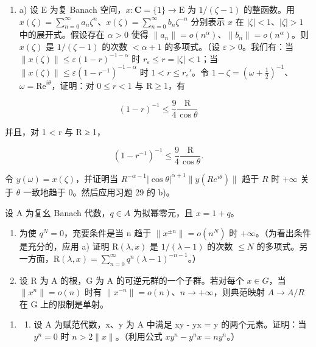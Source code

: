 \begin{enumerate}
\def\labelenumi{¶ \arabic{enumi})}
\setcounter{enumi}{29}
\tightlist
\item
  a) 设 E 为复 Banach 空间，\(x: \mathbf{C}=\{1\}\to\mathrm{E}\) 为 \(1/(\zeta-1)\) 的整函数。用 \(x(\zeta)=\sum_{n=0}^{\infty}a_{n}\zeta^{n}\)、\(x(\zeta)=\sum_{n=0}^{\infty}b_{n}\zeta^{-n}\) 分别表示 \(x\) 在 \(|\zeta|<1\)、\(|\zeta|>1\) 中的展开式。假设存在 \(\alpha>0\) 使得 \(\|a_{n}\|=o(n^{\alpha})\)、\(\|b_{n}\|=o(n^{\alpha})\)。则 \(x(\zeta)\) 是 \(1 / (\zeta - 1)\) 的次数 \(< \alpha + 1\) 的多项式。（设 \(\varepsilon > 0\)。我们有：当 \(\|x(\zeta)\| \leqslant \varepsilon(1 - r)^{-1 - \alpha}\) 时 \(r_{\varepsilon} \leqslant r = |\zeta| < 1\)；当 \(\|x(\zeta)\| \leqslant \varepsilon(1 - r^{-1})^{-1 - \alpha}\) 时 \(1 < r \leqslant r_{\varepsilon}'\)。令 \(1 - \zeta = (\omega + \frac{1}{2})^{-1}\)、\(\omega = \mathrm{Re}^{i\theta}\)，证明：对 \(0 \leqslant r < 1\) 与 \(\mathrm{R} \geqslant 1\)，有
\end{enumerate}

\[
(1 - r) ^ {- 1} \leqslant \frac {9}{4} \frac {\mathrm{R}}{\cos \theta}
\]

并且，对 1 \textless{} r 与 R ≥ 1，

\[
(1 - r ^ {- 1}) ^ {- 1} \leqslant \frac {9}{4} \frac {\mathrm{R}}{\cos \theta}.
\]

令 \(y(\omega) = x(\zeta)\)，并证明当 \(R^{-\alpha - 1}|\cos \theta|^{\alpha + 1}\| y(Re^{i\theta})\|\) 趋于 \(R\) 时 \(+\infty\) 关于 \(\theta\) 一致地趋于 0。然后应用习题 29 的 b)。

设 A 为复幺 Banach 代数，\(q \in A\) 为拟幂零元，且 \(x = 1 + q\)。

\begin{enumerate}
\def\labelenumi{\alph{enumi})}
\setcounter{enumi}{1}
\item
  为使 \(q^{N}=0\)，充要条件是当 n 趋于 \(\|x^{\pm n}\|=o(n^{N})\) 时 \(+\infty\)。（为看出条件是充分的，应用 a) 证明 \(\mathrm{R}(\lambda,x)\) 是 \(1/(\lambda-1)\) 的次数 \(\leqslant N\) 的多项式。另一方面，\(\mathrm{R}(\lambda,x)=\sum_{n=0}^{\infty}q^{n}(\lambda-1)^{-n-1}\)。）
\item
  设 R 为 A 的根，G 为 A 的可逆元群的一个子群。若对每个 \(x \in G\)，当 \(\|x^{n}\| = o(n)\) 时有 \(\|x^{-n}\| = o(n)\)、\(n \to +\infty\)，则典范映射 \(A \to A/R\) 在 G 上的限制是单射。
\end{enumerate}

\begin{enumerate}
\def\labelenumi{\arabic{enumi})}
\setcounter{enumi}{30}
\tightlist
\item
  \begin{enumerate}
  \def\labelenumii{\alph{enumii})}
  \tightlist
  \item
    设 A 为赋范代数，x、y 为 A 中满足 xy - yx = y 的两个元素。证明：当 \(y^{n} = 0\) 时 \(n > 2\|x\|\)。（利用公式 \(xy^{n} - y^{n}x = ny^{n}\)。）
  \end{enumerate}
\end{enumerate}

